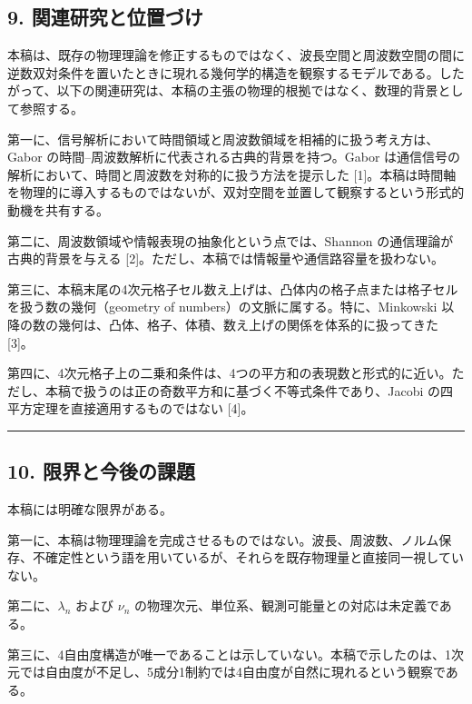 \documentclass[
]{ltjsarticle}
\begin{document}
\subsection{9.
関連研究と位置づけ}\label{ux95a2ux9023ux7814ux7a76ux3068ux4f4dux7f6eux3065ux3051}

本稿は、既存の物理理論を修正するものではなく、波長空間と周波数空間の間に逆数双対条件を置いたときに現れる幾何学的構造を観察するモデルである。したがって、以下の関連研究は、本稿の主張の物理的根拠ではなく、数理的背景として参照する。

第一に、信号解析において時間領域と周波数領域を相補的に扱う考え方は、Gabor
の時間--周波数解析に代表される古典的背景を持つ。Gabor
は通信信号の解析において、時間と周波数を対称的に扱う方法を提示した
{[}1{]}。本稿は時間軸を物理的に導入するものではないが、双対空間を並置して観察するという形式的動機を共有する。

第二に、周波数領域や情報表現の抽象化という点では、Shannon
の通信理論が古典的背景を与える
{[}2{]}。ただし、本稿では情報量や通信路容量を扱わない。

第三に、本稿末尾の4次元格子セル数え上げは、凸体内の格子点または格子セルを扱う数の幾何（geometry
of numbers）の文脈に属する。特に、Minkowski
以降の数の幾何は、凸体、格子、体積、数え上げの関係を体系的に扱ってきた
{[}3{]}。

第四に、4次元格子上の二乗和条件は、4つの平方和の表現数と形式的に近い。ただし、本稿で扱うのは正の奇数平方和に基づく不等式条件であり、Jacobi
の四平方定理を直接適用するものではない {[}4{]}。

\begin{center}\rule{0.5\linewidth}{0.5pt}\end{center}

\subsection{10.
限界と今後の課題}\label{ux9650ux754cux3068ux4ecaux5f8cux306eux8ab2ux984c}

本稿には明確な限界がある。

第一に、本稿は物理理論を完成させるものではない。波長、周波数、ノルム保存、不確定性という語を用いているが、それらを既存物理量と直接同一視していない。

第二に、\(\lambda_n\) および \(\nu_n\)
の物理次元、単位系、観測可能量との対応は未定義である。

第三に、4自由度構造が唯一であることは示していない。本稿で示したのは、1次元では自由度が不足し、5成分1制約では4自由度が自然に現れるという観察である。
\end{document}

